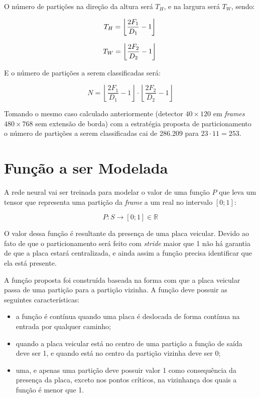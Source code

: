 O número de partições na direção da altura será $T_H$, e na largura será
$T_W$, sendo:

\begin{equation}
	T_H=\left\lfloor \frac{2F_1}{D_1}-1 \right\rfloor \\
\end{equation}

\begin{equation}
	T_W=\left\lfloor \frac{2F_2}{D_2}-1 \right\rfloor \\
\end{equation}

E o número de partições a serem classificadas será:

\begin{equation}
	N=\left\lfloor \frac{2F_1}{D_1}-1 \right\rfloor \cdot
		\left\lfloor \frac{2F_2}{D_2}-1 \right\rfloor
\end{equation}

Tomando o mesmo caso calculado anteriormente (detector $40 \times 120$ em
\emph{frames} $480 \times 768$ sem extensão de borda) com a estratégia proposta
de particionamento o número de partições a serem classificadas cai de 286.209
para $23 \cdot 11=253$.

\section{Função a ser Modelada} \label{ses:funcao_a_modelar}

A rede neural vai ser treinada para modelar o valor de uma função $P$ que
leva um tensor que representa uma partição da \emph{frame} a um real no
intervalo $[0;1]$:

\begin{equation}
	P:S \to [0;1] \in \mathbb{R} 
\end{equation}

O valor dessa função é resultante da presença de uma placa veicular. Devido ao
fato de que o particionamento será feito com \emph{stride} maior que 1 não há
garantia de que a placa estará centralizada, e ainda assim a função precisa
identificar que ela está presente.

A função proposta foi construída baseada na forma com que a placa veicular
passa de uma partição para a partição vizinha. A função deve possuir as
seguintes características:

\begin{itemize}
\item a função é contínua quando uma placa é deslocada de forma contínua na
	entrada por qualquer caminho;
\item quando a placa veicular está no centro de uma partição a função de
	saída deve ser 1, e quando está no centro da partição vizinha deve ser 0;
\item uma, e apenas uma partição deve possuir valor 1 como consequência da
	presença da placa, exceto nos pontos críticos, na vizinhança dos quais a
	função é menor que 1.
\end{itemize}

